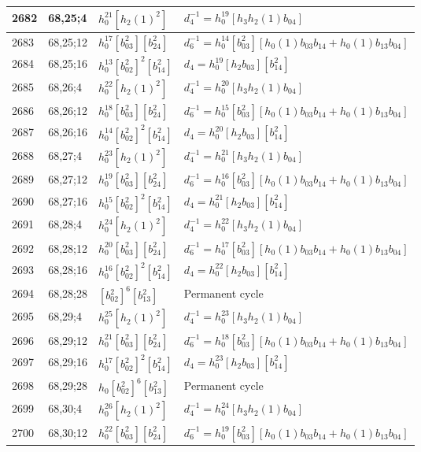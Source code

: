 \documentclass{article}
\begin{document}
\begin{longtable}{|l|l|>{\raggedright\arraybackslash}p{6cm}|>{\raggedright\arraybackslash}p{6cm}|}
\hline
2682 & 68,25;4 & $h_0^{21}[h_2(1)^2]$ & $d_{4}^{-1}=h_0^{19}[h_3h_2(1)b_{04}]$\\
\hline
2683 & 68,25;12 & $h_0^{17}[b_{03}^2][b_{24}^2]$ & $d_{6}^{-1}=h_0^{14}[b_{03}^2][h_0(1)b_{03}b_{14} + h_0(1)b_{13}b_{04}]$\\
\hline
2684 & 68,25;16 & $h_0^{13}[b_{02}^2]^2[b_{14}^2]$ &$d_{4}=h_0^{19}[h_2b_{03}][b_{14}^2]$\\
\hline
2685 & 68,26;4 & $h_0^{22}[h_2(1)^2]$ & $d_{4}^{-1}=h_0^{20}[h_3h_2(1)b_{04}]$\\
\hline
2686 & 68,26;12 & $h_0^{18}[b_{03}^2][b_{24}^2]$ & $d_{6}^{-1}=h_0^{15}[b_{03}^2][h_0(1)b_{03}b_{14} + h_0(1)b_{13}b_{04}]$\\
\hline
2687 & 68,26;16 & $h_0^{14}[b_{02}^2]^2[b_{14}^2]$ &$d_{4}=h_0^{20}[h_2b_{03}][b_{14}^2]$\\
\hline
2688 & 68,27;4 & $h_0^{23}[h_2(1)^2]$ & $d_{4}^{-1}=h_0^{21}[h_3h_2(1)b_{04}]$\\
\hline
2689 & 68,27;12 & $h_0^{19}[b_{03}^2][b_{24}^2]$ & $d_{6}^{-1}=h_0^{16}[b_{03}^2][h_0(1)b_{03}b_{14} + h_0(1)b_{13}b_{04}]$\\
\hline
2690 & 68,27;16 & $h_0^{15}[b_{02}^2]^2[b_{14}^2]$ &$d_{4}=h_0^{21}[h_2b_{03}][b_{14}^2]$\\
\hline
2691 & 68,28;4 & $h_0^{24}[h_2(1)^2]$ & $d_{4}^{-1}=h_0^{22}[h_3h_2(1)b_{04}]$\\
\hline
2692 & 68,28;12 & $h_0^{20}[b_{03}^2][b_{24}^2]$ & $d_{6}^{-1}=h_0^{17}[b_{03}^2][h_0(1)b_{03}b_{14} + h_0(1)b_{13}b_{04}]$\\
\hline
2693 & 68,28;16 & $h_0^{16}[b_{02}^2]^2[b_{14}^2]$ &$d_{4}=h_0^{22}[h_2b_{03}][b_{14}^2]$\\
\hline
2694 & 68,28;28 & $[b_{02}^2]^6[b_{13}^2]$ & Permanent cycle\\
\hline
2695 & 68,29;4 & $h_0^{25}[h_2(1)^2]$ & $d_{4}^{-1}=h_0^{23}[h_3h_2(1)b_{04}]$\\
\hline
2696 & 68,29;12 & $h_0^{21}[b_{03}^2][b_{24}^2]$ & $d_{6}^{-1}=h_0^{18}[b_{03}^2][h_0(1)b_{03}b_{14} + h_0(1)b_{13}b_{04}]$\\
\hline
2697 & 68,29;16 & $h_0^{17}[b_{02}^2]^2[b_{14}^2]$ &$d_{4}=h_0^{23}[h_2b_{03}][b_{14}^2]$\\
\hline
2698 & 68,29;28 & $h_0[b_{02}^2]^6[b_{13}^2]$ & Permanent cycle\\
\hline
2699 & 68,30;4 & $h_0^{26}[h_2(1)^2]$ & $d_{4}^{-1}=h_0^{24}[h_3h_2(1)b_{04}]$\\
\hline
2700 & 68,30;12 & $h_0^{22}[b_{03}^2][b_{24}^2]$ & $d_{6}^{-1}=h_0^{19}[b_{03}^2][h_0(1)b_{03}b_{14} + h_0(1)b_{13}b_{04}]$\\

\end{longtable}
\end{document}
